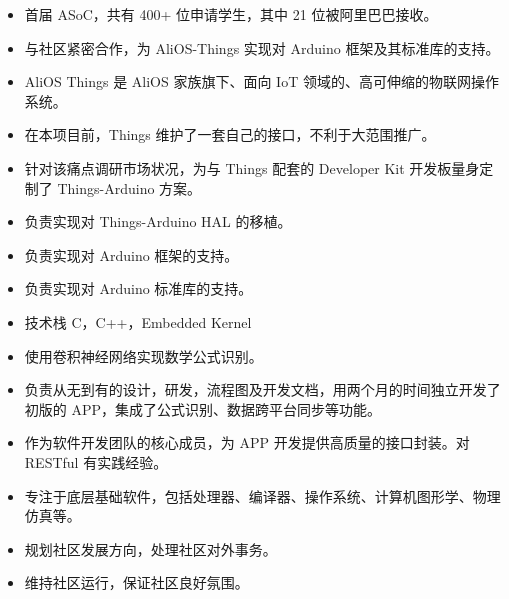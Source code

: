 \documentclass{resume}
\begin{document}
\continue
\clearpage

\begin{itemize}
  \item 首届 ASoC，共有 400+ 位申请学生，其中 21 位被阿里巴巴接收。
  \item 与社区紧密合作，为 AliOS-Things 实现对 Arduino 框架及其标准库的支持。
  \item AliOS Things 是 AliOS 家族旗下、面向 IoT 领域的、高可伸缩的物联网操作系统。
  \item 在本项目前，Things 维护了一套自己的接口，不利于大范围推广。
  \item 针对该痛点调研市场状况，为与 Things 配套的 Developer Kit 开发板量身定制了 Things-Arduino 方案。
  \item 负责实现对 Things-Arduino HAL 的移植。
  \item 负责实现对 Arduino 框架的支持。
  \item 负责实现对 Arduino 标准库的支持。
  \item 技术栈 C，C++，Embedded Kernel
\end{itemize}

\begin{itemize}
  \item 使用卷积神经网络实现数学公式识别。
  \item 负责从无到有的设计，研发，流程图及开发文档，用两个月的时间独立开发了初版的 APP，集成了公式识别、数据跨平台同步等功能。
  \item 作为软件开发团队的核心成员，为 APP 开发提供高质量的接口封装。对 RESTful 有实践经验。
\end{itemize}

\begin{itemize}
  \item 专注于底层基础软件，包括处理器、编译器、操作系统、计算机图形学、物理仿真等。
  \item 规划社区发展方向，处理社区对外事务。
  \item 维持社区运行，保证社区良好氛围。
\end{itemize}
\end{document}

